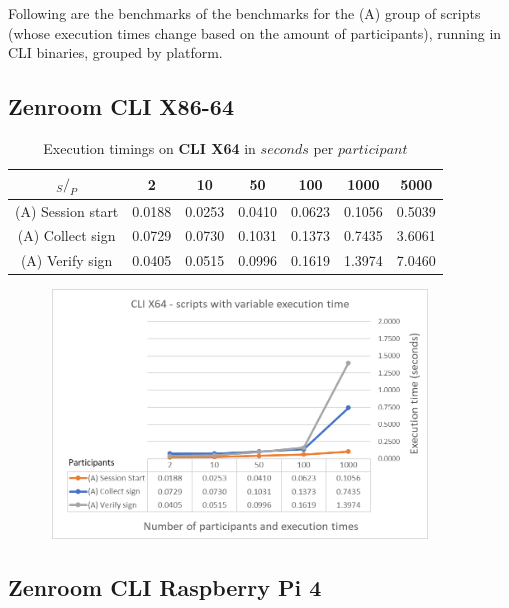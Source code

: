 \documentclass[twocolumn]{article}
\begin{document}
Following are the benchmarks of the benchmarks for the (A) group of scripts (whose execution times change based on the amount of participants), running in CLI binaries, grouped by platform.


\subsection*{Zenroom CLI X86-64}


\begin{table}[h!]
  \begin{center}
    \caption{Execution timings on \textbf{CLI X64} in $seconds$ per $participant$}
      \label{tab:table1}
        \begin{tabular} {c|c|c|c|c|c|c}
          \toprule
           \textbf{$_S / _P$} & \textbf{2} & \textbf{10} & \textbf{50} & \textbf{100} & \textbf{1000} & \textbf{5000} \\
          \midrule
          (A) Session start & 0.0188 & 0.0253 & 0.0410 & 0.0623 & 0.1056 & 0.5039 \\
          (A) Collect sign & 0.0729 & 0.0730 & 0.1031 & 0.1373 & 0.7435 & 3.6061 \\
          (A) Verify sign & 0.0405 & 0.0515 & 0.0996 & 0.1619 & 1.3974 & 7.0460 \\
      \bottomrule %
    \end{tabular}
  \end{center}
\end{table}


\begin{figure}[h!]
    \centering
    \includegraphics[width=4in, height=2.6in]{graphs/CLIX64.png}
    \label{fig:galaxy}
\end{figure}




\subsection*{Zenroom CLI Raspberry Pi 4}
\end{document}
